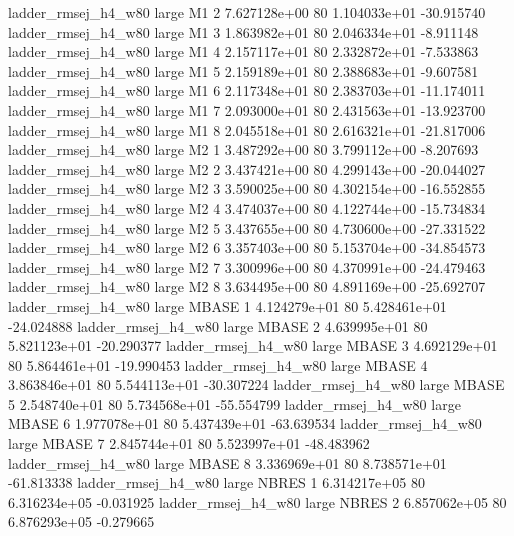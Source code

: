 ladder_rmsej_h4_w80      large       M1                 2 7.627128e+00 80   1.104033e+01         -30.915740
ladder_rmsej_h4_w80      large       M1                 3 1.863982e+01 80   2.046334e+01          -8.911148
ladder_rmsej_h4_w80      large       M1                 4 2.157117e+01 80   2.332872e+01          -7.533863
ladder_rmsej_h4_w80      large       M1                 5 2.159189e+01 80   2.388683e+01          -9.607581
ladder_rmsej_h4_w80      large       M1                 6 2.117348e+01 80   2.383703e+01         -11.174011
ladder_rmsej_h4_w80      large       M1                 7 2.093000e+01 80   2.431563e+01         -13.923700
ladder_rmsej_h4_w80      large       M1                 8 2.045518e+01 80   2.616321e+01         -21.817006
ladder_rmsej_h4_w80      large       M2                 1 3.487292e+00 80   3.799112e+00          -8.207693
ladder_rmsej_h4_w80      large       M2                 2 3.437421e+00 80   4.299143e+00         -20.044027
ladder_rmsej_h4_w80      large       M2                 3 3.590025e+00 80   4.302154e+00         -16.552855
ladder_rmsej_h4_w80      large       M2                 4 3.474037e+00 80   4.122744e+00         -15.734834
ladder_rmsej_h4_w80      large       M2                 5 3.437655e+00 80   4.730600e+00         -27.331522
ladder_rmsej_h4_w80      large       M2                 6 3.357403e+00 80   5.153704e+00         -34.854573
ladder_rmsej_h4_w80      large       M2                 7 3.300996e+00 80   4.370991e+00         -24.479463
ladder_rmsej_h4_w80      large       M2                 8 3.634495e+00 80   4.891169e+00         -25.692707
ladder_rmsej_h4_w80      large    MBASE                 1 4.124279e+01 80   5.428461e+01         -24.024888
ladder_rmsej_h4_w80      large    MBASE                 2 4.639995e+01 80   5.821123e+01         -20.290377
ladder_rmsej_h4_w80      large    MBASE                 3 4.692129e+01 80   5.864461e+01         -19.990453
ladder_rmsej_h4_w80      large    MBASE                 4 3.863846e+01 80   5.544113e+01         -30.307224
ladder_rmsej_h4_w80      large    MBASE                 5 2.548740e+01 80   5.734568e+01         -55.554799
ladder_rmsej_h4_w80      large    MBASE                 6 1.977078e+01 80   5.437439e+01         -63.639534
ladder_rmsej_h4_w80      large    MBASE                 7 2.845744e+01 80   5.523997e+01         -48.483962
ladder_rmsej_h4_w80      large    MBASE                 8 3.336969e+01 80   8.738571e+01         -61.813338
ladder_rmsej_h4_w80      large    NBRES                 1 6.314217e+05 80   6.316234e+05          -0.031925
ladder_rmsej_h4_w80      large    NBRES                 2 6.857062e+05 80   6.876293e+05          -0.279665
